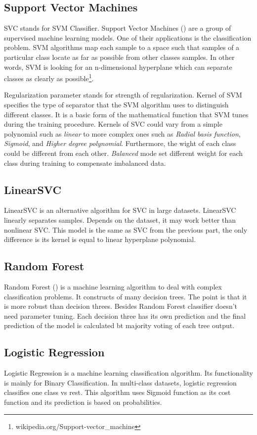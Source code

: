 \subsection{Support Vector Machines}
\label{SVM}
SVC stands for \ac{SVM} Classifier. Support Vector Machines (\cite{svc})  are a group of supervised machine learning models. One of their applications is the classification problem. \ac{SVM} algorithms map each sample to a space such that samples of a particular class locate as far as possible from other classes samples. In other words, \ac{SVM} is looking for an n-dimensional hyperplane which can separate classes as clearly as possible\footnote{wikipedia.org/Support-vector\_machine}.

Regularization parameter stands for strength of regularization. Kernel of \ac{SVM} specifies the type of separator that the \ac{SVM} algorithm uses to distinguish different classes. It is a basic form of the mathematical function that \ac{SVM} tunes during the training procedure. Kernels of SVC could vary from a simple polynomial such as \textit{linear} to more complex ones such as \textit{Radial basis function}, \textit{Sigmoid}, and \textit{Higher degree polynomial}. Furthermore, the wight of each class could be different from each other. \textit{Balanced} mode set different weight for each class during training to compensate imbalanced data. 


\subsection{LinearSVC}
LinearSVC is an alternative algorithm for SVC in large datasets. LinearSVC linearly separates samples. Depends on the dataset, it may work better than nonlinear SVC. This model is the same as SVC from the previous part, the only difference is its kernel is equal to linear hyperplane polynomial. 

\subsection{Random Forest}
Random Forest (\cite{randomforest}) is a machine learning algorithm to deal with complex classification problems. It constructs of many decision trees. The point is that it is more robust than decision threes. Besides Random Forest classifier doesn't need parameter tuning. Each decision three has its own prediction and the final prediction of the model is calculated bt majority voting of each tree output. 

\subsection{Logistic Regression}
Logistic Regression is a machine learning classification algorithm. Its functionality is mainly for Binary Classification. In multi-class datasets, logistic regression classifies one class vs rest. This algorithm uses Sigmoid function as its cost function and its prediction is based on probabilities. 

